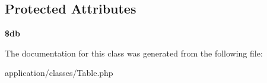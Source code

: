 \subsection*{Protected Attributes}
\begin{DoxyCompactItemize}
\item 
\hypertarget{class_table_a1fa3127fc82f96b1436d871ef02be319}{
{\bfseries \$db}}
\label{class_table_a1fa3127fc82f96b1436d871ef02be319}

\end{DoxyCompactItemize}


The documentation for this class was generated from the following file:\begin{DoxyCompactItemize}
\item 
application/classes/Table.php\end{DoxyCompactItemize}

